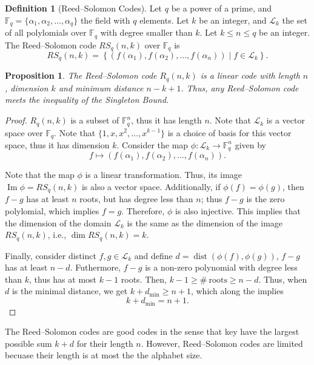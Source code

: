 \documentclass[11pt, letterpaper]{amsart}
\newtheorem{prop}[thm]{Proposition}
\theoremstyle{definition}
\newtheorem{defn}[]{Definition}
\DeclareMathOperator{\dist}{dist}
\DeclareMathOperator{\Ima}{Im}
\begin{document}
\begin{defn}[Reed--Solomon Codes]
	Let $q$ be a power of a prime, and $\mathbb{F}_q = \{\alpha_1, \alpha_2, \dots, \alpha_q\}$ the field with $q$ elements. Let $k$ be an integer, and $\mathcal{L}_k$ the set of all polylomials over $\mathbb{F}_q$ with degree smaller than $k$. Let $k \le n \le q$ be an integer. The Reed--Solomon code $RS_q(n, k)$ over $\mathbb{F}_q$ is \[
		RS_q(n, k) = \left\{\left(f(\alpha_1), f(\alpha_2), \dots, f(\alpha_n)\right) \mid f \in \mathcal{L}_k\right\}.
	\]
\end{defn}

\begin{prop}
	The Reed--Solomon code $R_q(n, k)$ is a linear code with length $n$, dimension $k$ and minimum distance $n - k + 1$.
	Thus, any Reed--Solomon code meets the inequality of the Singleton Bound.
\end{prop}

\begin{proof}
	$R_q(n, k)$ is a subset of $\mathbb{F}_q^n$, thus it has length $n$.  
	Note that $\mathcal L_k$ is a vector space over $\mathbb{F}_q$. Note that $\{1, x, x^2, \dots, x^{k-1}\}$ is a choice of basis for this vector space, thus it has dimension $k$. Consider the map $\phi: \mathcal L_k \to \mathbb{F}_q^n$ given by \[
		f \mapsto (f(\alpha_1), f(\alpha_2), \dots, f(\alpha_n)).
	\]

	Note that the map $\phi$ is a linear transformation. Thus, its image $\Ima \phi = RS_q(n, k)$ is also a vector space.  
	Additionally, if $\phi(f) = \phi(g)$, then $f - g$ has at least $n$ roots, but has degree less than $n$; thus $f - g$ is the zero polylomial, which implies $f = g$. Therefore, $\phi$ is also injective. This implies that the dimension of the domain $\mathcal L_k$ is the same as the dimension of the image $RS_q(n, k)$, i.e.,  $\dim RS_q(n, k) = k$.
	
	Finally, consider distinct $f, g \in \mathcal L_k$ and define $d = \dist(\phi(f), \phi(g))$, $f - g$ has at least $n - d$. Futhermore, $f - g$ is a non-zero polynomial with degree less than $k$, thus has at most $k - 1$ roots. Then,  $ k - 1 \ge \#\ \text{roots} \ge n - d$.
	Thus, when $d$ is the minimal distance, we get $k + d_{\mathrm{min}} \ge n + 1$, which along the  implies \[
		k + d_\text{min} = n + 1.
	\]

\end{proof}

The Reed--Solomon codes are good codes in the sense that key have the largest possible sum $k + d$ for their length $n$. However, Reed--Solomon codes are limited becuase their length is at most the the alphabet size.
\end{document}
